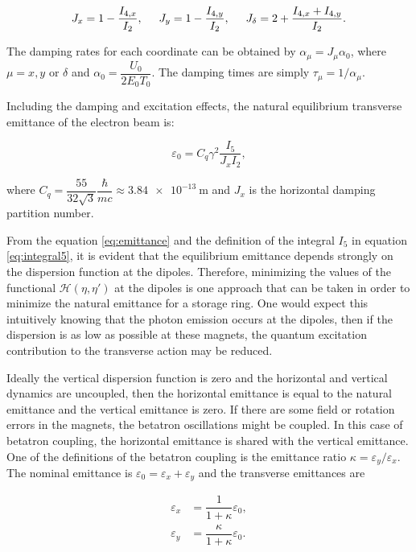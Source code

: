 \begin{equation*}
    J_x = 1 - \dfrac{I_{4,x}}{I_2}, \hspace{0.5cm} J_y = 1 - \dfrac{I_{4,y}}{I_2}, \hspace{0.5cm} J_{\delta} = 2 + \dfrac{I_{4,x} + I_{4,y}}{I_2}.
\end{equation*}

The damping rates for each coordinate can be obtained by $\alpha_{\mu} = J_{\mu} \alpha_0$, where $\mu = x, y$ or $\delta$ and $\alpha_0 = \dfrac{U_0}{2E_0T_0}$. The damping times are simply $\tau_{\mu} = 1/\alpha_{\mu}$.

Including the damping and excitation effects, the natural equilibrium transverse emittance of the electron beam is:

\begin{equation}
    \varepsilon_0 = C_q \gamma^2 \dfrac{I_5}{J_x I_2},
    \label{eq:emittance}
\end{equation}

where $C_q = \dfrac{55}{32 \sqrt{3}}\dfrac{\hbar}{mc} \approx \SI{3.84e-13}{\metre}$ and $J_x$ is the horizontal damping partition number.

From the equation \eqref{eq:emittance} and the definition of the integral $I_5$ in equation \eqref{eq:integral5}, it is evident that the equilibrium emittance depends strongly on the dispersion function at the dipoles. Therefore, minimizing the values of the functional $\mathcal{H}(\eta, \eta')$ at the dipoles is one approach that can be taken in order to minimize the natural emittance for a storage ring. One would expect this intuitively knowing that the photon emission occurs at the dipoles, then if the dispersion is as low as possible at these magnets, the quantum excitation contribution to the transverse action may be reduced.

Ideally the vertical dispersion function is zero and the horizontal and vertical dynamics are uncoupled, then the horizontal emittance is equal to the natural emittance and the vertical emittance is zero. If there are some field or rotation errors in the magnets, the betatron oscillations might be coupled. In this case of betatron coupling, the horizontal emittance is shared with the vertical emittance. One of the definitions of the betatron coupling is the emittance ratio $\kappa = \varepsilon_y/\varepsilon_x$. The nominal emittance is $\varepsilon_0 = \varepsilon_x + \varepsilon_y$ and the transverse emittances are

\begin{align}
    \varepsilon_x &= \dfrac{1}{1 + \kappa}\varepsilon_0, \\
    \varepsilon_y &= \dfrac{\kappa}{1 + \kappa}\varepsilon_0.
\end{align}

